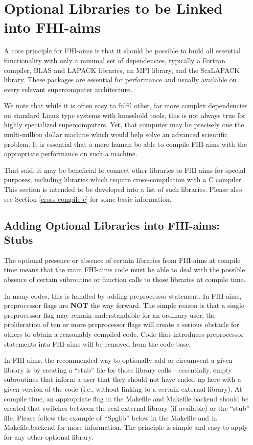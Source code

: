 \chapter{Optional Libraries to be Linked into FHI-aims}
\label{appendix_external_packages_and_variants}

A core principle for FHI-aims is that it should be possible to build
all essential functionality with only a minimal set of dependencies,
typically a Fortran compiler, BLAS and LAPACK libraries, an MPI
library, and the ScaLAPACK library. These packages are essential for
performance and usually available on every relevant supercomputer
architecture. 

We note that while it is often easy to fulfil other,
far more complex dependencies on standard Linux type systems with
household tools, this is not always true for highly specialized
supercomputers. Yet, that computer may be precisely one the
multi-million dollar machine which would help solve an advanced
scientific problem. It is essential that a mere human be able to
compile FHI-aims with the appropriate performance on such a machine. 

That said, it may be beneficial to connect other libraries to FHI-aims
for special purposes, including libraries which require
cross-compilation with a C compiler. This section is intended to be
developed into a list of such libraries. Please also see Section
\ref{cross-compile-c} for some basic information.

\section{Adding Optional Libraries into FHI-aims: Stubs}

The optional presence or absence of certain libraries from FHI-aims at
compile time means that the main FHI-aims code must be able to deal
with the possible absence of certain subroutine or function calls to
those libraries at compile time.

In many codes, this is handled by adding preprocessor statement. In
FHI-aims, preprocessor flags are \textbf{NOT} the way forward. The
simple reason is that a single preprocessor flag may remain
understandable for an ordinary user; the proliferation of ten or more
preprocessor flags will create a serious obstacle for others to obtain
a reasonably compiled code. Code that introduces preprocessor
statements into FHI-aims will be removed from the code base.  

In FHI-aims, the recommended way to optionally add or circumvent a
given library is by creating a ``stub'' file for those library calls
-- essentially, empty subroutines that inform a user that they should
not have ended up here with a given version of the code (i.e., without
linking to a certain external library). At compile time, an
appropriate flag in the Makefile and Makefile.backend should be
created that switches between the real external library (if available)
or the ``stub'' file. Please follow the example of ``Spglib'' below in
the Makefile and in Makefile.backend for more information. The
principle is simple and easy to apply for any other optional library.

